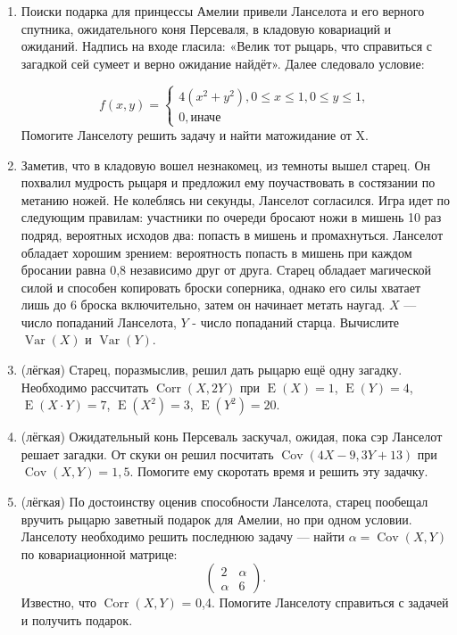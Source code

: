 \documentclass[a4paper,12pt]{article}
\DeclareMathOperator{\Cov}{Cov}
\DeclareMathOperator{\Corr}{Corr}
\DeclareMathOperator{\Var}{Var}
\DeclareMathOperator{\E}{E}
\begin{document}
\begin{enumerate} %
\item Поиски подарка для принцессы Амелии привели Ланселота и его верного спутника, ожидательного коня Персеваля, в кладовую ковариаций и ожиданий. Надпись на входе гласила: «Велик тот рыцарь, что справиться с загадкой сей сумеет и верно ожидание найдёт». Далее следовало условие:

\[
   f(x, y)=
   \begin{cases}
   4(x^2 + y^2), 0 \leq x \leq 1, 0 \leq y \leq 1, \\
    0, \text{иначе}
    \end{cases}
\]
Помогите Ланселоту решить задачу и найти матожидание от X.
\item Заметив, что в кладовую вошел незнакомец, из темноты вышел старец. Он похвалил мудрость рыцаря и предложил ему поучаствовать в состязании по метанию ножей. Не колеблясь ни секунды, Ланселот согласился. Игра идет по следующим правилам: участники по очереди бросают ножи в мишень 10 раз подряд, вероятных исходов два: попасть в мишень и промахнуться. Ланселот обладает хорошим зрением: вероятность попасть в мишень при каждом бросании равна 0,8 независимо друг от друга. Старец обладает магической силой и способен копировать броски соперника, однако его силы хватает лишь до 6 броска включительно, затем он начинает метать наугад. $X$ — число попаданий Ланселота, $Y$ - число попаданий старца. Вычислите $\Var(X)$ и $\Var(Y)$.
\item (лёгкая) Старец, поразмыслив, решил дать рыцарю ещё одну загадку. Необходимо рассчитать $\Corr(X, 2Y)$ при $\E(X)=1$, $\E(Y)=4$, $\E(X\cdot Y)=7$, $\E(X^2)=3$, $\E(Y^2)=20$.
\item (лёгкая) Ожидательный конь Персеваль заскучал, ожидая, пока сэр Ланселот решает загадки. От скуки он решил посчитать $\Cov(4X-9, 3Y+13)$ при $\Cov(X, Y)=1,5$. Помогите ему скоротать время и решить эту задачку.
\item (лёгкая) По достоинству оценив способности Ланселота, старец пообещал вручить рыцарю заветный подарок для Амелии, но при одном условии. Ланселоту необходимо решить последнюю задачу — найти $\alpha = \Cov(X, Y)$ по ковариационной матрице:
\[
\begin{pmatrix}
2 & \alpha \\
\alpha & 6
\end{pmatrix}.
\]
Известно, что $\Corr(X, Y) $ = 0,4.
Помогите Ланселоту справиться с задачей и получить подарок.
\end{enumerate}
\end{document}
